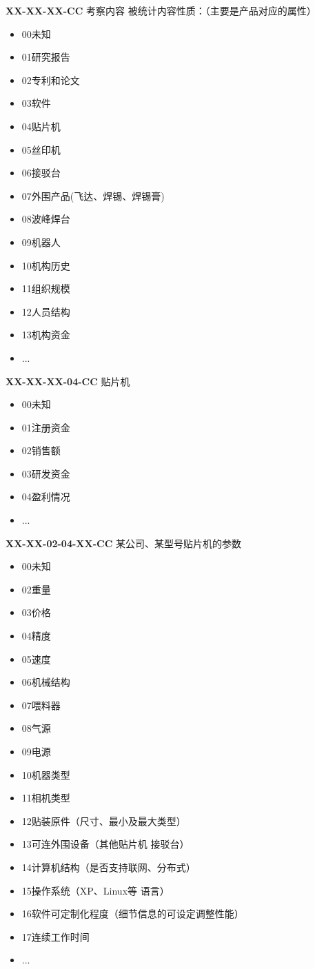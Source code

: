 \documentclass[a4paper,12pt,UTF8]{article}
\begin{document}
\textbf{XX-XX-XX-CC} 考察内容
被统计内容性质：（主要是产品对应的属性）
\begin{itemize}
  \item 00未知%
  \item 01研究报告%
  \item 02专利和论文%
  \item 03软件
  \item 04贴片机
  \item 05丝印机
  \item 06接驳台
  \item 07外围产品(飞达、焊锡、焊锡膏)
  \item 08波峰焊台
  \item 09机器人
  \item 10机构历史
  \item 11组织规模
  \item 12人员结构
  \item 13机构资金
  \item ...
\end{itemize}

\textbf{XX-XX-XX-04-CC} 贴片机
\begin{itemize}
  \item 00未知%
  \item 01注册资金
  \item 02销售额
  \item 03研发资金
  \item 04盈利情况
  \item ...
\end{itemize}

\textbf{XX-XX-02-04-XX-CC} 某公司、某型号贴片机的参数
\begin{itemize}
  \item 00未知%
  \item 02重量
  \item 03价格
  \item 04精度
  \item 05速度
  \item 06机械结构
  \item 07喂料器
  \item 08气源
  \item 09电源
  \item 10机器类型
  \item 11相机类型
  \item 12贴装原件（尺寸、最小及最大类型）
  \item 13可连外围设备（其他贴片机 接驳台）
  \item 14计算机结构（是否支持联网、分布式）
  \item 15操作系统（XP、Linux等 语言）
  \item 16软件可定制化程度（细节信息的可设定调整性能）
  \item 17连续工作时间
  \item ...
\end{itemize}
\end{document}
